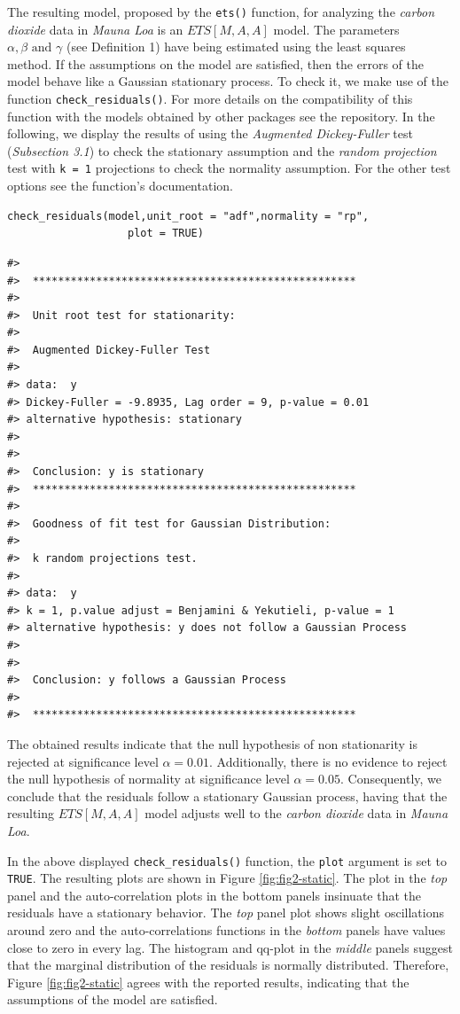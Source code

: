 The resulting model, proposed by the \texttt{ets()} function, for analyzing the \emph{carbon dioxide} data in \emph{Mauna Loa} is an \(ETS[M,A,A]\) model. The parameters \(\alpha, \beta \text{ and } \gamma\) (see Definition 1) have being estimated using the least squares method. If the assumptions on the model are satisfied, then the errors of the model behave like a Gaussian stationary process. To check it, we make use of the function \texttt{check\_residuals()}. For more details on the compatibility of this function with the models obtained by other packages see the  repository. In the following, we display the results of using the \emph{Augmented Dickey-Fuller} test (\emph{Subsection 3.1}) to check the stationary assumption and the \emph{random projection} test with \texttt{k\ =\ 1} projections to check the normality assumption. For the other test options see the function's documentation.

\begin{verbatim}
check_residuals(model,unit_root = "adf",normality = "rp",
                   plot = TRUE)
\end{verbatim}

\begin{verbatim}
#> 
#>  *************************************************** 
#> 
#>  Unit root test for stationarity: 
#> 
#>  Augmented Dickey-Fuller Test
#> 
#> data:  y
#> Dickey-Fuller = -9.8935, Lag order = 9, p-value = 0.01
#> alternative hypothesis: stationary
#> 
#> 
#>  Conclusion: y is stationary
#>  *************************************************** 
#> 
#>  Goodness of fit test for Gaussian Distribution: 
#> 
#>  k random projections test.
#> 
#> data:  y
#> k = 1, p.value adjust = Benjamini & Yekutieli, p-value = 1
#> alternative hypothesis: y does not follow a Gaussian Process
#> 
#> 
#>  Conclusion: y follows a Gaussian Process
#>  
#>  ***************************************************
\end{verbatim}

The obtained results indicate that the null hypothesis of non stationarity is rejected at significance level \(\alpha = 0.01.\) Additionally, there is no evidence to reject the null hypothesis of normality at significance level \(\alpha = 0.05.\) Consequently, we conclude that the residuals follow a stationary Gaussian process, having that the resulting \(ETS[M,A,A]\) model adjusts well to the \emph{carbon dioxide} data in \emph{Mauna Loa}.

In the above displayed \texttt{check\_residuals()} function, the \texttt{plot} argument is set to \texttt{TRUE}. The resulting plots are shown in Figure \ref{fig:fig2-static}. The plot in the \emph{top} panel and the auto-correlation plots in the bottom panels insinuate that the residuals have a stationary behavior. The \emph{top} panel plot shows slight oscillations around zero and the auto-correlations functions in the \emph{bottom} panels have values close to zero in every lag. The histogram and qq-plot in the \emph{middle} panels suggest that the marginal distribution of the residuals is normally distributed. Therefore, Figure \ref{fig:fig2-static} agrees with the reported results, indicating that the assumptions of the model are satisfied.

